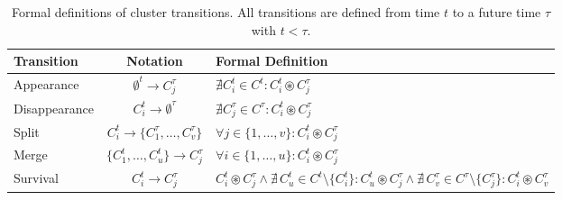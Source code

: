 \begin{table}[t]
    \centering
    {\footnotesize
        \begin{tabularx}{\columnwidth}{|l|c|X|}
            \hline
            \textbf{Transition} & \textbf{Notation}                                 & \textbf{Formal Definition}                                       \\
            \hline
            Appearance          & $\emptyset^t \rightarrow C_j^\tau$                &
            $\nexists C_i^t \in C^t: C_i^t \circledast C_j^{\tau}$                                                                                     \\
            \hline
            Disappearance       & $C_i^t \rightarrow \emptyset^{\tau}$              & $\nexists C_j^{\tau} \in C^{\tau}: C_i^t \circledast C_j^{\tau}$ \\
            \hline
            Split               & $C_i^t \rightarrow \{C_1^\tau, \dots, C_v^\tau\}$ & $\forall j \in \{1, \dots, v\}: C_i^t  \circledast C_j^{\tau}$   \\
            \hline
            Merge               & $\{C_1^t, \dots, C_u^t\} \rightarrow C_j^\tau$    & $\forall i \in \{1, \dots, u\}: C_i^t  \circledast C_j^{\tau}$   \\
            \hline
            Survival            & $C_i^t \rightarrow C_j^\tau$                      & $C_i^t \circledast C_j^\tau \land
                \nexists\, C_u^t \in C^t \setminus \{C_i^t\}: C_u^t \circledast C_j^\tau \land
            \nexists\, C_v^\tau \in C^\tau \setminus \{C_j^\tau\}: C_i^t \circledast C_v^\tau$                                                         \\
            \hline
        \end{tabularx}
    }
    \caption{Formal definitions of cluster transitions. All transitions are defined from time $t$ to a future time $\tau$ with $t < \tau$.}\label{table:cluster_transitions}
\end{table}